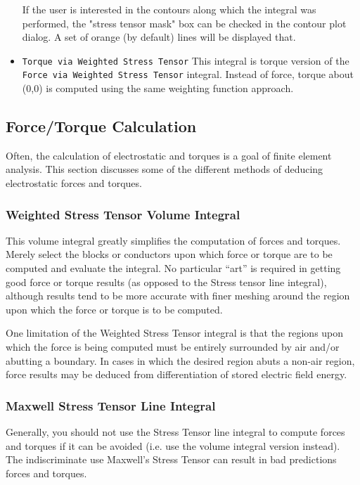 \documentclass[12pt]{report}
\begin{document}
\begin{itemize}
If the user is interested in the contours along which the integral was
performed, the "stress tensor mask" box can be checked in the contour plot
dialog. A set of orange (by default) lines will be displayed that.

\item \texttt{Torque via Weighted Stress Tensor} This integral is torque version
of the \texttt{Force via Weighted Stress Tensor} integral. Instead
of force, torque about (0,0) is computed using the same weighting
function approach.
\end{itemize}


\subsection{Force/Torque Calculation} \label{forcetorquesection}

Often, the calculation of electrostatic and torques is a goal of
finite element analysis. This section discusses some of the
different methods of deducing electrostatic forces and torques.

\subsubsection{Weighted Stress Tensor Volume Integral}

This volume integral greatly simplifies the computation of forces and
torques. Merely select the blocks or conductors upon which force or torque
are to be computed and evaluate the integral. No particular ``art'' is
required in getting good force or torque results (as opposed to the Stress
tensor line integral), although results tend to be more accurate with finer
meshing around the region upon which the force or torque is to be computed.

One limitation of the Weighted Stress Tensor integral is that the regions
upon which the force is being computed must be entirely surrounded by air
and/or abutting a boundary. In cases in which the desired region abuts a
non-air region, force results may be deduced from differentiation of stored
electric field energy.

\subsubsection{Maxwell Stress Tensor Line Integral}

Generally, you should not use the Stress Tensor line integral to compute
forces and torques if it can be avoided (i.e. use the volume integral
version instead). The indiscriminate use Maxwell's Stress Tensor can result
in bad predictions forces and torques.
\end{document}
